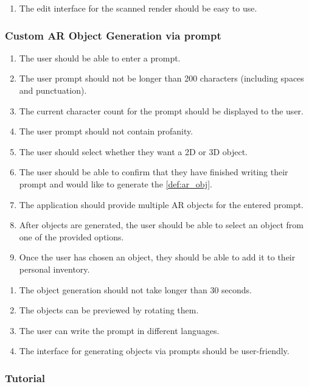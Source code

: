 \documentclass{article}
\begin{document}
\begin{enumerate}[label=OUI-NFR\arabic*:]
    \item The edit interface for the scanned render should be easy to use.
\end{enumerate}

\subsubsection{Custom AR Object Generation via prompt}
\label{ssub:prompt_obj_gen}

\begin{enumerate}[label=POG-FR\arabic*:]
    \item The user should be able to enter a prompt.
    \item The user prompt should not be longer than 200 characters (including spaces and punctuation).
    \item The current character count for the prompt should be displayed to the user.
    \item The user prompt should not contain profanity.
    \item The user should select whether they want a 2D or 3D object.
    \item The user should be able to confirm that they have finished writing their prompt and would like to generate the \ref{def:ar_obj}.
    \item The application should provide multiple AR objects for the entered prompt.
    \item After objects are generated, the user should be able to select an object from one of the provided options.
    \item Once the user has chosen an object, they should be able to add it to their personal inventory.
\end{enumerate}

\begin{enumerate}[label=POG-NFR\arabic*:]
    \item The object generation should not take longer than 30 seconds.
    \item The objects can be previewed by rotating them.
    \item The user can write the prompt in different languages.
    \item The interface for generating objects via prompts should be user-friendly.
\end{enumerate}

\subsubsection{Tutorial}
\label{ssub:tutorial}
\end{document}
